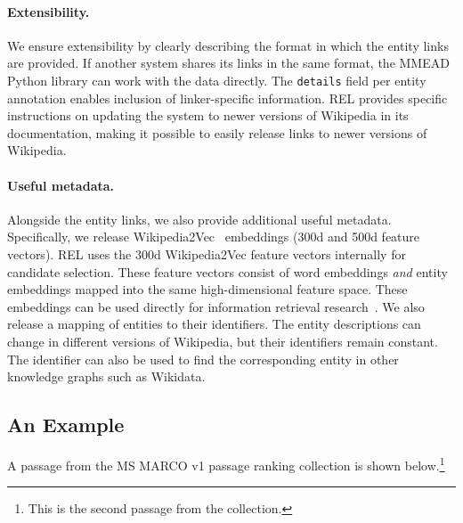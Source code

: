 \paragraph{Extensibility.} We ensure extensibility by clearly describing the format in which the entity links are provided. If another system shares its links in the same format, the MMEAD Python library can work with the data directly. The \texttt{details} field per entity annotation enables inclusion of linker-specific information. REL provides specific instructions on updating the system to newer versions of Wikipedia in its documentation, making it possible to easily release links to newer versions of Wikipedia.

\paragraph{Useful metadata.} Alongside the entity links, we also provide additional useful metadata. Specifically, we release Wikipedia2Vec~\citep{wikipedia2vec} embeddings (300d and 500d feature vectors). REL uses the 300d Wikipedia2Vec feature vectors internally for candidate selection. These feature vectors consist of word embeddings \emph{and} entity embeddings mapped into the same high-dimensional feature space. These embeddings can be used directly for information retrieval research~\citep{Gerritse:2020:GEER, Gerritse:2022:EMBERT}. We also release a mapping of entities to their identifiers. The entity descriptions can change in different versions of Wikipedia, but their identifiers remain constant.
The identifier can also be used to find the corresponding entity in other knowledge graphs such as Wikidata.

\subsection{An Example}
A passage from the MS MARCO v1 passage ranking collection is shown below.\footnote{This is the second passage from the collection.}

\smallskip
\begin{center}
\end{center}
\smallskip

